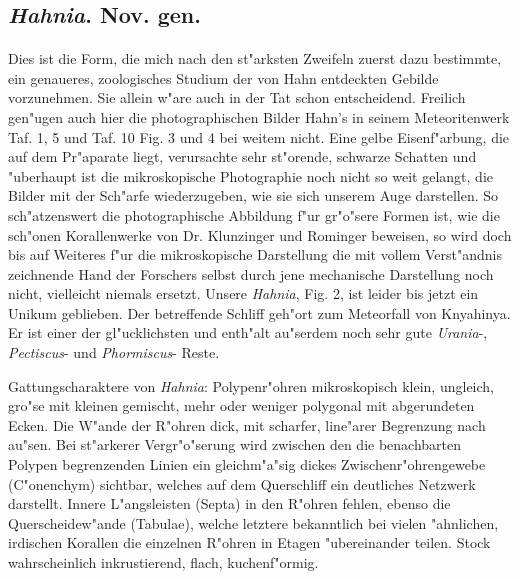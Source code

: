 \documentclass[a4paper, 11pt, oneside]{article}
\begin{document}
\section{}
\subsection{\emph{Hahnia}. Nov. gen.}
\paragraph{}
Dies ist die Form, die mich nach den st"arksten Zweifeln zuerst dazu bestimmte, ein genaueres, zoologisches Studium der von Hahn entdeckten Gebilde vorzunehmen. Sie allein w"are auch in der Tat schon entscheidend. Freilich gen"ugen auch hier die photographischen Bilder Hahn's in seinem Meteoritenwerk Taf. 1, 5 und Taf. 10 Fig. 3 und 4 bei weitem nicht. Eine gelbe Eisenf"arbung, die auf dem Pr"aparate liegt, verursachte sehr st"orende, schwarze Schatten und "uberhaupt ist die mikroskopische Photographie noch nicht so weit gelangt, die Bilder mit der Sch"arfe wiederzugeben, wie sie sich unserem Auge darstellen. So sch"atzenswert die photographische Abbildung f"ur gr"o"sere Formen ist, wie die sch"onen Korallenwerke von Dr. Klunzinger und Rominger beweisen, so wird doch bis auf Weiteres f"ur die mikroskopische Darstellung die mit vollem Verst"andnis zeichnende Hand der Forschers selbst durch jene mechanische Darstellung noch nicht, vielleicht niemals ersetzt. Unsere \emph{Hahnia}, Fig. 2, ist leider bis jetzt ein Unikum geblieben. Der betreffende Schliff geh"ort zum Meteorfall von Knyahinya. Er ist einer der gl"ucklichsten und enth"alt au"serdem noch sehr gute \emph{Urania}-, \emph{Pectiscus}- und \emph{Phormiscus}- Reste.

Gattungscharaktere von \emph{Hahnia}: Polypenr"ohren mikroskopisch klein, ungleich, gro"se mit kleinen gemischt, mehr oder weniger polygonal mit abgerundeten Ecken. Die W"ande der R"ohren dick, mit scharfer, line"arer Begrenzung nach au"sen. Bei st"arkerer Vergr"o"serung wird zwischen den die benachbarten Polypen begrenzenden Linien ein gleichm"a"sig dickes Zwischenr"ohrengewebe (C"onenchym) sichtbar, welches auf dem Querschliff ein deutliches Netzwerk darstellt. Innere L"angsleisten (Septa) in den R"ohren fehlen, ebenso die Querscheidew"ande (Tabulae), welche letztere bekanntlich bei vielen "ahnlichen, irdischen Korallen die einzelnen R"ohren in Etagen "ubereinander teilen. Stock wahrscheinlich inkrustierend, flach, kuchenf"ormig.
\end{document}
